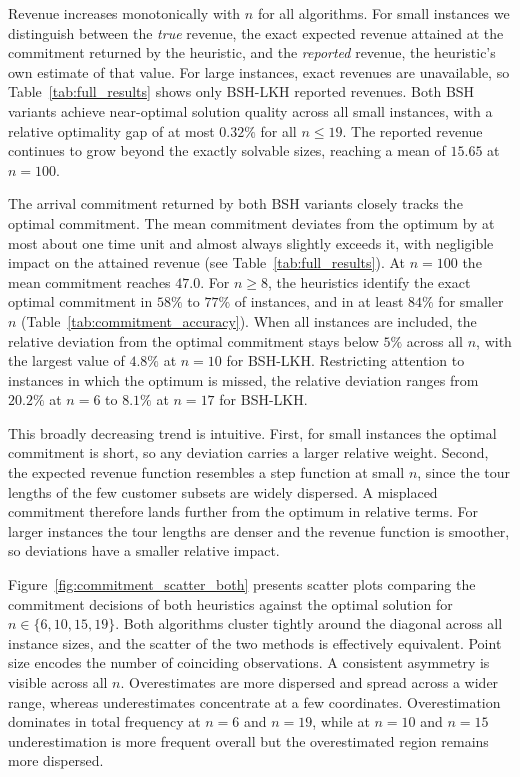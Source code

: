\documentclass[11pt]{article}
\theoremstyle{plain}
\theoremstyle{definition}
\begin{document}
  Revenue increases monotonically with $n$ for all algorithms. For small instances we distinguish between the \emph{true} revenue, the exact expected revenue attained at the commitment returned by the heuristic, and the \emph{reported} revenue, the heuristic's own estimate of that value. For large instances, exact revenues are unavailable, so Table~\ref{tab:full_results} shows only BSH-\ac{LKH} reported revenues. Both BSH variants achieve near-optimal solution quality across all small instances, with a relative optimality gap of at most $0.32\%$ for all $n \leq 19$. The reported revenue continues to grow beyond the exactly solvable sizes, reaching a mean of $15.65$ at $n = 100$.
  
  The arrival commitment returned by both BSH variants closely tracks the optimal commitment. The mean commitment deviates from the optimum by at most about one time unit and almost always slightly exceeds it, with negligible impact on the attained revenue (see Table~\ref{tab:full_results}). At $n = 100$ the mean commitment reaches $47.0$. For $n \geq 8$, the heuristics identify the exact optimal commitment in $58\%$ to $77\%$ of instances, and in at least $84\%$ for smaller $n$ (Table~\ref{tab:commitment_accuracy}). When all instances are included, the relative deviation from the optimal commitment stays below $5\%$ across all $n$, with the largest value of $4.8\%$ at $n = 10$ for BSH-\ac{LKH}. Restricting attention to instances in which the optimum is missed, the relative deviation ranges from $20.2\%$ at $n = 6$ to $8.1\%$ at $n = 17$ for BSH-\ac{LKH}.
  
  This broadly decreasing trend is intuitive. First, for small instances the optimal commitment is short, so any deviation carries a larger relative weight. Second, the expected revenue function resembles a step function at small $n$, since the tour lengths of the few customer subsets are widely dispersed. A misplaced commitment therefore lands further from the optimum in relative terms. For larger instances the tour lengths are denser and the revenue function is smoother, so deviations have a smaller relative impact.
  
  Figure~\ref{fig:commitment_scatter_both} presents scatter plots comparing the commitment decisions of both heuristics against the optimal solution for $n \in \{6, 10, 15, 19\}$. Both algorithms cluster tightly around the diagonal across all instance sizes, and the scatter of the two methods is effectively equivalent. Point size encodes the number of coinciding observations. A consistent asymmetry is visible across all $n$. Overestimates are more dispersed and spread across a wider range, whereas underestimates concentrate at a few coordinates. Overestimation dominates in total frequency at $n = 6$ and $n = 19$, while at $n = 10$ and $n = 15$ underestimation is more frequent overall but the overestimated region remains more dispersed.
\end{document}
